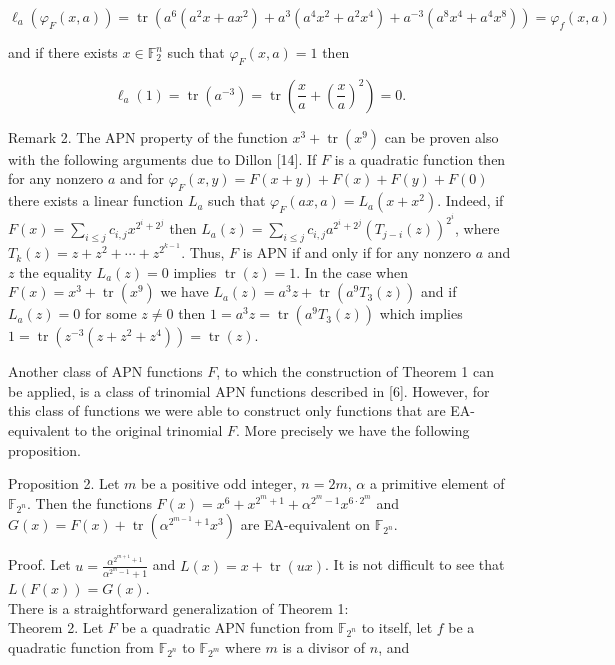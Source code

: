 \documentclass[10pt]{article}
\begin{document}
$$
\ell_{a}\left(\varphi_{F}(x, a)\right)=\operatorname{tr}\left(a^{6}\left(a^{2} x+a x^{2}\right)+a^{3}\left(a^{4} x^{2}+a^{2} x^{4}\right)+a^{-3}\left(a^{8} x^{4}+a^{4} x^{8}\right)\right)=\varphi_{f}(x, a)
$$

and if there exists $x \in \mathbb{F}_{2}^{n}$ such that $\varphi_{F}(x, a)=1$ then

$$
\ell_{a}(1)=\operatorname{tr}\left(a^{-3}\right)=\operatorname{tr}\left(\frac{x}{a}+\left(\frac{x}{a}\right)^{2}\right)=0 .
$$

Remark 2. The APN property of the function $x^{3}+\operatorname{tr}\left(x^{9}\right)$ can be proven also with the following arguments due to Dillon [14]. If $F$ is a quadratic function then for any nonzero $a$ and for $\varphi_{F}(x, y)= F(x+y)+F(x)+F(y)+F(0)$ there exists a linear function $L_{a}$ such that $\varphi_{F}(a x, a)=L_{a}\left(x+x^{2}\right)$. Indeed, if $F(x)=\sum_{i \leqslant j} c_{i, j} x^{2^{i}+2^{j}}$ then $L_{a}(z)=\sum_{i \leqslant j} c_{i, j} a^{2^{i}+2^{j}}\left(T_{j-i}(z)\right)^{2^{i}}$, where $T_{k}(z)=z+z^{2}+\cdots+z^{2^{k-1}}$. Thus, $F$ is APN if and only if for any nonzero $a$ and $z$ the equality $L_{a}(z)=0$ implies $\operatorname{tr}(z)=1$. In the case when $F(x)=x^{3}+\operatorname{tr}\left(x^{9}\right)$ we have $L_{a}(z)=a^{3} z+\operatorname{tr}\left(a^{9} T_{3}(z)\right)$ and if $L_{a}(z)=0$ for some $z \neq 0$ then $1=a^{3} z=\operatorname{tr}\left(a^{9} T_{3}(z)\right)$ which implies $1=\operatorname{tr}\left(z^{-3}\left(z+z^{2}+z^{4}\right)\right)=\operatorname{tr}(z)$.

Another class of APN functions $F$, to which the construction of Theorem 1 can be applied, is a class of trinomial APN functions described in [6]. However, for this class of functions we were able to construct only functions that are EA-equivalent to the original trinomial $F$. More precisely we have the following proposition.

Proposition 2. Let $m$ be a positive odd integer, $n=2 m$, $\alpha$ a primitive element of $\mathbb{F}_{2^{n}}$. Then the functions $F(x)=x^{6}+x^{2^{m}+1}+\alpha^{2^{m}-1} x^{6 \cdot 2^{m}}$ and $G(x)=F(x)+\operatorname{tr}\left(\alpha^{2^{m-1}+1} x^{3}\right)$ are EA-equivalent on $\mathbb{F}_{2^{n}}$.

Proof. Let $u=\frac{\alpha^{2^{m+1}+1}}{\alpha^{2^{m}-1}+1}$ and $L(x)=x+\operatorname{tr}(u x)$. It is not difficult to see that $L(F(x))=G(x)$.\\
There is a straightforward generalization of Theorem 1:\\
Theorem 2. Let $F$ be a quadratic APN function from $\mathbb{F}_{2^{n}}$ to itself, let $f$ be a quadratic function from $\mathbb{F}_{2^{n}}$ to $\mathbb{F}_{2^{m}}$ where $m$ is a divisor of $n$, and
\end{document}
